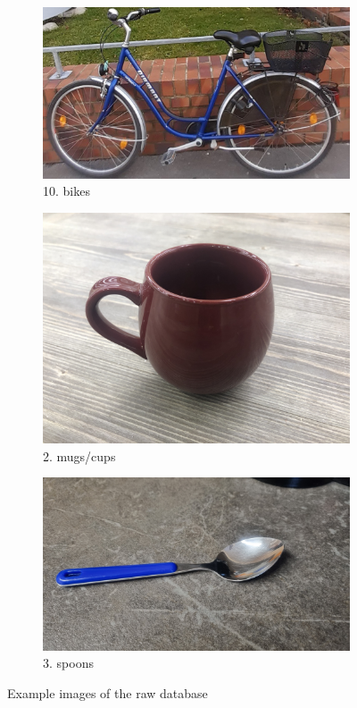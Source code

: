\documentclass{tubaf-article}
\begin{document}
	\begin{figure}[h!]
		\centering
		\begin{subfigure}[b]{0.3\textwidth}
			\centering
			\includegraphics[width=\textwidth]{ex1.jpeg}
			\caption{10. bikes}
			\label{fig:bild1}
		\end{subfigure}
		\hfill
		\begin{subfigure}[b]{0.3\textwidth}
			\centering
			\includegraphics[width=\textwidth]{ex3.jpeg}
			\caption{2. mugs/cups}
			\label{fig:bild2}
		\end{subfigure}
		\hfill
		\begin{subfigure}[b]{0.3\textwidth}
			\centering
			\includegraphics[width=\textwidth]{ex2.jpeg}
			\caption{3. spoons}
			\label{fig:bild2}
		\end{subfigure}
		\hfill
		\caption{Example images of the raw database}
		\label{fig:nebeneinander}
	\end{figure}
\end{document}
